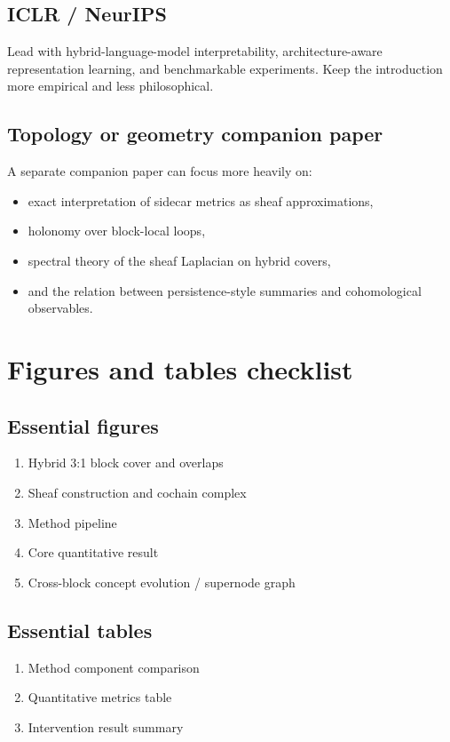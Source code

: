 \documentclass[11pt]{article}
\begin{document}
\subsection{ICLR / NeurIPS}
Lead with hybrid-language-model interpretability, architecture-aware representation learning, and benchmarkable experiments. Keep the introduction more empirical and less philosophical.

\subsection{Topology or geometry companion paper}
A separate companion paper can focus more heavily on:
\begin{itemize}[leftmargin=1.5em]
    \item exact interpretation of sidecar metrics as sheaf approximations,
    \item holonomy over block-local loops,
    \item spectral theory of the sheaf Laplacian on hybrid covers,
    \item and the relation between persistence-style summaries and cohomological observables.
\end{itemize}

\section{Figures and tables checklist}

\subsection*{Essential figures}
\begin{enumerate}[leftmargin=1.5em]
    \item Hybrid 3:1 block cover and overlaps
    \item Sheaf construction and cochain complex
    \item Method pipeline
    \item Core quantitative result
    \item Cross-block concept evolution / supernode graph
\end{enumerate}

\subsection*{Essential tables}
\begin{enumerate}[leftmargin=1.5em]
    \item Method component comparison
    \item Quantitative metrics table
    \item Intervention result summary
\end{enumerate}
\end{document}
